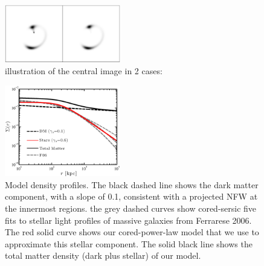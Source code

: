 \documentclass[chicago]{emulateapj}
\begin{document}





\newpage

\begin{figure}
\begin{center}
\centering
\includegraphics[trim= 0 0 0 0, width=0.45\textwidth]{figures/f_02.eps}
\centering
\end{center}
\caption{ illustration of the central image in 2 cases: 
\label{fig1}}
\end{figure}


\begin{figure}
\begin{center}
\centering
\includegraphics[trim= 0 0 5 6, clip, width=0.45\textwidth]{figures/f_01.eps}
\centering
\end{center}
\caption{ Model density profiles. The black dashed line shows the dark matter component, with a slope of 0.1, consistent with a projected NFW at the innermost regions. the grey dashed curves show cored-sersic five fits to stellar light profiles of massive galaxies from Ferrarese 2006. The red solid curve shows our cored-power-law model that we use to approximate this stellar component. The solid black line shows the total matter density (dark plus stellar) of our model. 
\label{fig2}}
\end{figure}
\end{document}
